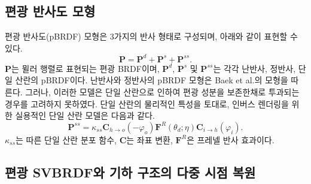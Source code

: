 \documentclass[a4paper,twocolumn]{article}
\begin{document}
\subsection{편광 반사도 모형}
\label{subsec:model}
편광 반사도(pBRDF) 모형은 3가지의 반사 형태로 구성되며, 아래와 같이 표현할 수 있다.
\begin{equation}
	\label{eq:diffuse_and_specular}
	\mathbf{P}={{\mathbf{P}}^{d}}+{{\mathbf{P}}^{s}}+{{\mathbf{P}}^{ss}}.
\end{equation}
${\mathbf{P}}$는 뮐러 행렬로 표현되는 편광 BRDF이며,  ${\mathbf{P}}^{d}$, ${\mathbf{P}}^{s}$ 및 ${\mathbf{P}}^{ss}$는 각각 난반사, 정반사, 단일 산란의 pBRDF이다.
난반사와 정반사의 pBRDF 모형은 Baek et al.\cite{Baek2018}의 모형을 따른다.
그러나, 이러한 모델은 단일 산란으로 인하여 편광 성분을 보존한채로 투과되는 경우를 고려하지 못하였다. 
단일 산란의 물리적인 특성을 토대로, 인버스 렌더링을 위한 실용적인 단일 산란 모델은 다음과 같다. 
\begin{equation}
	\label{eq:single_scattering_transport}
	{{\mathbf{P}}^{ss}}= {{\kappa}_{ss}} {{\mathbf{C}}_{h\to o}}\left(-{\varphi_{o}} \right){{\mathbf{F}}^{R}}\left( {{\theta }_{d}};\eta  \right){{\mathbf{C}}_{i\to h}}\left({\varphi_{i}} \right).
\end{equation}
%
$\kappa_{ss}$는 따른 단일 산란 분포 함수, $\mathbf{C}$는 좌표 변환, $\mathbf{F}^{R}$은 프레넬 반사 효과이다.


\subsection{편광 SVBRDF와 기하 구조의 다중 시점 복원}
\label{subsec:reconstruction}
\end{document}
